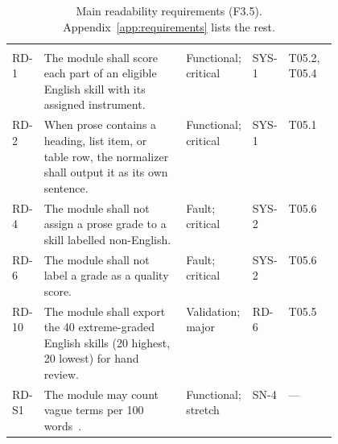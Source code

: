 \begin{singlespace}
\setlength{\LTcapwidth}{\linewidth}
\begin{longtable}{@{}L{0.09\linewidth} L{\tabcolsep\relax} L{0.14\linewidth} L{0.09\linewidth} L{0.15\linewidth}@{}}
\caption{Main readability requirements (F3.5). Appendix~\ref{app:requirements} lists the rest.}\label{tab:readability-reqs}\\
 &  &  &  & \\
\midrule
\endfirsthead
{}
 &  &  &  & \\
\midrule
\endhead
\bottomrule
\endfoot
RD-1 & The module shall score each part of an eligible English skill with its assigned instrument. & Functional; critical & SYS-1 & T05.2, T05.4\\
\addlinespace[3pt]
RD-2 & When prose contains a heading, list item, or table row, the normalizer shall output it as its own sentence. & Functional; critical & SYS-1 & T05.1\\
\addlinespace[3pt]
RD-4 & The module shall not assign a prose grade to a skill labelled non-English. & Fault; critical & SYS-2 & T05.6\\
\addlinespace[3pt]
RD-6 & The module shall not label a grade as a quality score. & Fault; critical & SYS-2 & T05.6\\
\addlinespace[3pt]
RD-10 & The module shall export the 40 extreme-graded English skills (20 highest, 20 lowest) for hand review. & Validation; major & RD-6 & T05.5\\
\addlinespace[3pt]
RD-S1 & The module may count vague terms per 100 words~\cite{femmer2017smells}. & Functional; stretch & SN-4 & ---\\
\end{longtable}
\end{singlespace}

